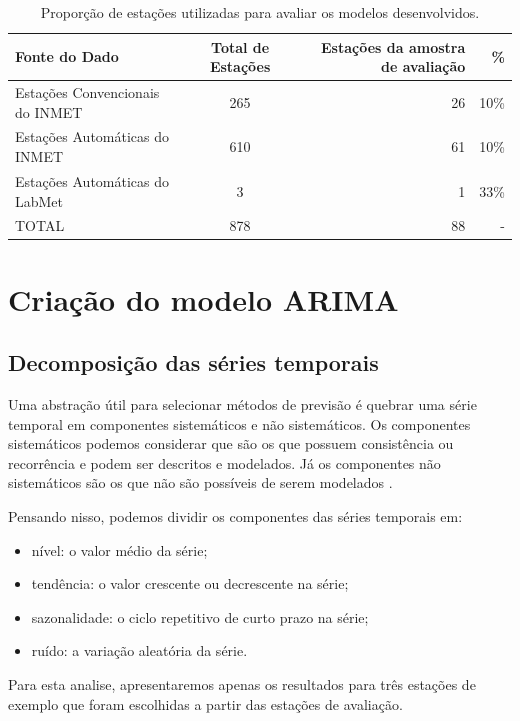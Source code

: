 \begin{table}[H]
\caption{Proporção de estações utilizadas para avaliar os modelos desenvolvidos.}
\label{tab:amostra_estacoes}
\begin{adjustbox}{width=\textwidth}
\begin{tabular}{|l|c|r|r|}
\hline
\textbf{Fonte do Dado} & \textbf{Total de Estações} & \textbf{Estações da amostra de avaliação} & \% \\
\hline
Estações Convencionais do INMET  & 265 & 26 & 10\% \\
\hline
Estações Automáticas do INMET & 610 & 61 & 10\% \\
\hline
Estações Automáticas do LabMet & 3 & 1 & 33\% \\
\hline
TOTAL & 878 & 88 & - \\
\hline
\end{tabular}
\end{adjustbox}
\end{table}

\section{Criação do modelo ARIMA}

\subsection{Decomposição das séries temporais}

Uma abstração útil para selecionar métodos de previsão é quebrar uma série temporal em componentes sistemáticos e não sistemáticos. Os componentes sistemáticos podemos considerar que são os que possuem consistência ou recorrência e podem ser descritos e modelados. Já os componentes não sistemáticos são os que não são possíveis de serem modelados \cite{box2011time}.

Pensando nisso, podemos dividir os componentes das séries temporais em:
\begin{itemize}
  \item nível: o valor médio da série;
  \item tendência: o valor crescente ou decrescente na série;
  \item sazonalidade: o ciclo repetitivo de curto prazo na série;
  \item ruído: a variação aleatória da série.
\end{itemize}

Para esta analise, apresentaremos apenas os resultados para três estações de exemplo que foram escolhidas a partir das estações de avaliação.

